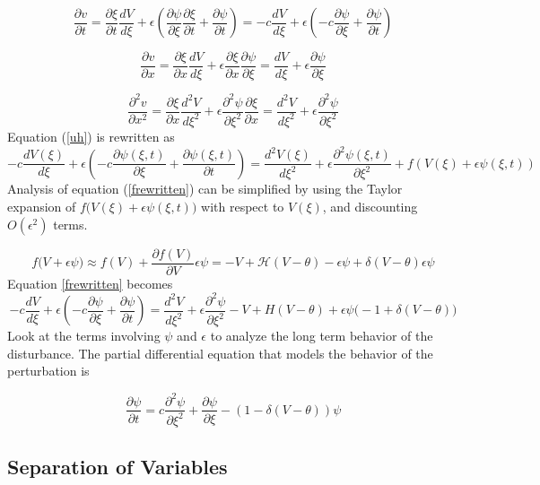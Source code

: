 \documentclass[12pt]{article}
\begin{document}
$$\frac{\partial v}{\partial t}=\frac{\partial\xi}{\partial t}\frac{dV}{d\xi}+\epsilon(\frac{\partial \psi}{\partial \xi}\frac{\partial \xi}{\partial t}+\frac{\partial \psi}{\partial t}) = -c\frac{dV}{d\xi}+\epsilon(-c\frac{\partial \psi}{\partial \xi}+\frac{\partial \psi}{\partial t})$$

$$\frac{\partial v}{\partial x}=\frac{\partial \xi}{\partial x}\frac{dV}{d\xi}+\epsilon\frac{\partial\xi}{\partial x}\frac{\partial\psi}{\partial\xi} = \frac{dV}{d\xi}+\epsilon\frac{\partial\psi}{\partial\xi}$$

$$\frac{\partial^2 v}{\partial x^2}=\frac{\partial \xi}{\partial x}\frac{d^2V}{d\xi^2}+\epsilon\frac{\partial^2\psi}{\partial\xi^2}\frac{\partial \xi}{\partial x} = \frac{d^2V}{d\xi^2}+\epsilon\frac{\partial^2\psi}{\partial\xi^2}$$
Equation (\ref{uh}) is rewritten as 
\begin{equation}
\label{frewritten}
-c\frac{dV(\xi)}{d\xi}+\epsilon(-c\frac{\partial \psi(\xi,t)}{\partial \xi}+\frac{\partial \psi(\xi,t)}{\partial t})=\frac{d^2V(\xi)}{d\xi^2}+\epsilon\frac{\partial^2\psi(\xi,t)}{\partial\xi^2}+f(V(\xi)+\epsilon\psi(\xi,t))
\end{equation}
Analysis of equation (\ref{frewritten}) can be simplified by using the Taylor expansion of $f\big(V(\xi)+\epsilon\psi(\xi,t)\big)$ with respect to $V(\xi)$, and discounting $O(\epsilon ^2)$ terms.

$$f\big(V+\epsilon\psi \big) \approx f(V) + \frac{\partial f(V)}{\partial V}\epsilon\psi = -V +\mathcal{H}(V-\theta) - \epsilon\psi + \delta(V-\theta)\epsilon\psi $$
Equation \ref{frewritten} becomes
$$-c\frac{dV}{d\xi}+\epsilon(-c\frac{\partial \psi}{\partial \xi}+\frac{\partial \psi}{\partial t})= 
\frac{d^2V}{d\xi^2}+\epsilon\frac{\partial^2\psi}{\partial\xi^2}-V+H(V-\theta)+\epsilon\psi\big(-1+\delta(V-\theta)\big)$$
Look at the terms involving $\psi$ and $\epsilon$ to analyze the long term behavior of the disturbance. The partial differential equation that models the behavior of the perturbation is

\begin{equation} \label{pde_nh}
\frac{\partial \psi}{\partial t} = c \frac{\partial^2\psi}{\partial\xi^2} + \frac{\partial\psi}{\partial\xi} - (1 - \delta(V-\theta))\psi
\end{equation} 


\subsection{Separation of Variables}
\end{document}
